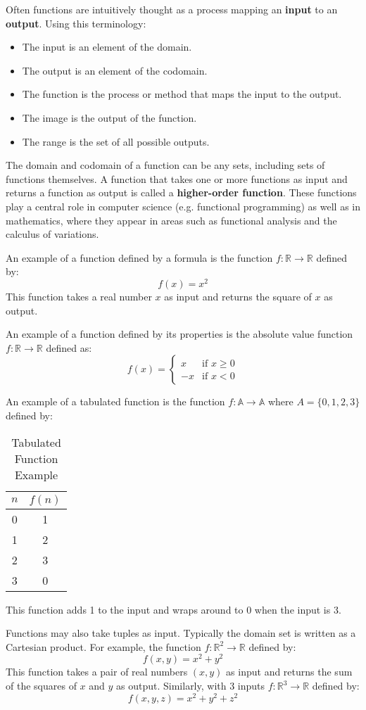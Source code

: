 Often functions are intuitively thought as a process mapping an \textbf{input} to
an \textbf{output}. Using this terminology:
\begin{itemize}
  \item The input is an element of the domain.
  \item The output is an element of the codomain.
  \item The function is the process or method that maps the input to the output.
  \item The image is the output of the function.
  \item The range is the set of all possible outputs.
\end{itemize}

\begin{advancedTopic}
  The domain and codomain of a function can be any sets, including
  sets of functions themselves. A function that takes one or more functions
  as input and returns a function as output is called a \textbf{higher-order
  function}. These functions play a central role in computer science
  (e.g. functional programming) as well as in mathematics, where they
  appear in areas such as functional analysis and the calculus of variations.
\end{advancedTopic}

An example of a function defined by a formula is the function \( f: \mathbb{R} \to \mathbb{R} \)
defined by:
\[
  f(x) = x^2
\]
\noindent This function takes a real number \( x \) as input and returns the square of \( x \) as
output.

An example of a function defined by its properties is the absolute value function
\( f: \mathbb{R} \to \mathbb{R} \) defined as:
\[
  f(x) = \begin{cases}
    x & \text{if } x \geq 0 \\
    -x & \text{if } x < 0
  \end{cases}
\]

An example of a tabulated function is the function \( f: \mathbb{A} \to \mathbb{A} \)
where \( A = \{ 0, 1, 2, 3 \}\) defined by:
\begin{table}[H]
  \centering
  \begin{tabular}{cc}
    \toprule
    \textbf{\(n\)} & \textbf{\(f(n)\)} \\
    \midrule
    0 & 1 \\
    1 & 2 \\
    2 & 3 \\
    3 & 0 \\
    \bottomrule
  \end{tabular}
  \caption{Tabulated Function Example}
\end{table}
\noindent This function adds 1 to the input and wraps around to 0 when the input is 3.

Functions may also take tuples as input. Typically the domain set is written as a Cartesian
product. For example, the function \( f: \mathbb{R}^2 \to \mathbb{R} \) defined by:
\[
  f(x, y) = x^2 + y^2
\]
\noindent This function takes a pair of real numbers \( (x, y) \) as input and returns the sum of
the squares of \( x \) and \( y \) as output. Similarly, with 3 inputs \( f: \mathbb{R}^3 \to
\mathbb{R} \) defined by:
\[
  f(x, y, z) = x^2 + y^2 + z^2
\]

